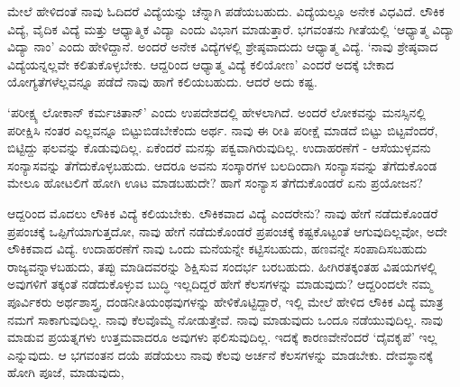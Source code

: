 ಮೇಲೆ ಹೇಳಿದಂತೆ ನಾವು ಓದಿದರೆ 
ವಿದ್ಯೆಯನ್ನು ಚೆನ್ನಾಗಿ 
ಪಡೆಯಬಹುದು. ವಿದ್ಯೆಯಲ್ಲೂ 
ಅನೇಕ ವಿಧವಿದೆ. ಲೌಕಿಕ ವಿದ್ಯೆ, 
ವೈದಿಕ ವಿದ್ಯೆ ಮತ್ತು 
ಆಧ್ಯಾತ್ಮಿಕ ವಿದ್ಯಾ  ಎಂದು 
ವಿಭಾಗ ಮಾಡುತ್ತಾರೆ. ಭಗವಂತನು 
ಗೀತೆಯಲ್ಲಿ `ಆಧ್ಯಾತ್ಮ 
ವಿದ್ಯಾ ವಿದ್ಯಾ ನಾಂ' ಎಂದು 
ಹೇಳಿದ್ದಾನೆ. ಅಂದರೆ ಅನೇಕ 
ವಿದ್ಯೆಗಳಲ್ಲಿ 
ಶ್ರೇಷ್ಠವಾದುದು ಆಧ್ಯಾತ್ಮ 
ವಿದ್ಯೆ. `ನಾವು ಶ್ರೇಷ್ಠವಾದ 
ವಿದ್ಯೆಯನ್ನಲ್ಲವೇ 
ಕಲಿತುಕೊಳ್ಳಬೇಕು. ಆದ್ದರಿಂದ 
ಆಧ್ಯಾತ್ಮ ವಿದ್ಯೆ ಕಲಿಯೋಣ' 
ಎಂದರೆ ಅದಕ್ಕೆ ಬೇಕಾದ 
ಯೋಗ್ಯತೆಗಳೆಲ್ಲವನ್ನೂ ಪಡೆದೆ ನಾವು ಹಾಗೆ ಕಲಿಯಬಹುದು. ಆದರೆ ಅದು ಕಷ್ಟ.

`ಪರೀಕ್ಷ್ಯ ಲೋಕಾನ್ 
ಕರ್ಮಚಿತಾನ್' ಎಂದು 
ಉಪದೇಶದಲ್ಲಿ ಹೇಳಲಾಗಿದೆ. 
ಅಂದರೆ ಲೋಕವನ್ನು 
ಮನಸ್ಸಿನಲ್ಲಿ ಪರೀಕ್ಷಿಸಿ 
ನಂತರ ಎಲ್ಲವನ್ನೂ 
ಬಿಟ್ಟುಬಿಡಬೇಕೆಂದು ಅರ್ಥ. 
ನಾವು ಈ ರೀತಿ ಪರೀಕ್ಷೆ ಮಾಡದೆ 
ಬಿಟ್ಟು ಬಿಟ್ಟವೆಂದರೆ, 
ಬಿಟ್ಟಿದ್ದು ಫಲವನ್ನು 
ಕೊಡುವುದಿಲ್ಲ. ಏಕೆಂದರೆ 
ಮನಸ್ಸು ಪಕ್ವವಾಗಿರುವುದಿಲ್ಲ. 
ಉದಾಹರಣೆಗೆ - ಆಸೆಯುಳ್ಳವನು 
ಸಂನ್ಯಾಸವನ್ನು 
ತೆಗೆದುಕೊಳ್ಳಬಹುದು. ಆದರೂ 
ಅವನು ಸಂಸ್ಕಾರಗಳ ಬಲದಿಂದಾಗಿ 
ಸಂನ್ಯಾಸವನ್ನು ತೆಗೆದುಕೊಂಡ 
ಮೇಲೂ ಹೋಟಲಿಗೆ ಹೋಗಿ ಊಟ ಮಾಡಬಹುದೇ? ಹಾಗೆ ಸಂನ್ಯಾಸ ತೆಗೆದುಕೊಂಡರೆ ಏನು ಪ್ರಯೋಜನ?

ಆದ್ದರಿಂದ ಮೊದಲು ಲೌಕಿಕ 
ವಿದ್ಯೆ ಕಲಿಯಬೇಕು. ಲೌಕಿಕವಾದ 
ವಿದ್ಯೆ ಎಂದರೇನು? ನಾವು ಹೇಗೆ 
ನಡೆದುಕೊಂಡರೆ ಪ್ರಪಂಚಕ್ಕೆ 
ಒಪ್ಪಿಗೆಯಾಗುತ್ತದೋ, ನಾವು 
ಹೇಗೆ ನಡೆದುಕೊಂಡರೆ 
ಪ್ರಪಂಚಕ್ಕೆ ಕಷ್ಟಕೊಟ್ಟಂತೆ 
ಆಗುವುದಿಲ್ಲವೋ, ಅದೇ 
ಲೌಕಿಕವಾದ ವಿದ್ಯೆ. 
ಉದಾಹರಣೆಗೆ ನಾವು ಒಂದು 
ಮನೆಯನ್ನೇ ಕಟ್ಟಿಸಬಹುದು, 
ಹಣವನ್ನೇ ಸಂಪಾದಿಸಬಹುದು 
ರಾಜ್ಯವನ್ನಾಳಬಹುದು, ತಪ್ಪು 
ಮಾಡಿದವರನ್ನು ಶಿಕ್ಷಿಸುವ 
ಸಂದರ್ಭ ಬರಬಹುದು. 
ಹೀಗಿರತಕ್ಕಂತಹ ವಿಷಯಗಳಲ್ಲಿ 
ಅವುಗಳಿಗೆ ತಕ್ಕಂತೆ 
ನಡೆದುಕೊಳ್ಳುವ ಬುದ್ಧಿ 
ಇಲ್ಲದಿದ್ದರೆ ಹೇಗೆ 
ಕೆಲಸಗಳನ್ನು ಮಾಡುವುದು? 
ಆದ್ದರಿಂದಲೇ ನಮ್ಮ ಪೂರ್ವಿಕರು 
ಅರ್ಥಶಾಸ್ತ್ರ, 
ದಂಡನೀತಿಯಂಥವುಗಳನ್ನು 
ಹೇಳಿಕೊಟ್ಟಿದ್ದಾರೆ, ಇಲ್ಲಿ 
ಮೇಲೆ ಹೇಳಿದ ಲೌಕಿಕ ವಿದ್ಯೆ 
ಮಾತ್ರ ನಮಗೆ ಸಾಕಾಗುವುದಿಲ್ಲ. 
ನಾವು ಕೆಲವೊಮ್ಮೆ 
ನೋಡುತ್ತೇವೆ. ನಾವು ಮಾಡುವುದು 
ಒಂದೂ ನಡೆಯುವುದಿಲ್ಲ. ನಾವು 
ಮಾಡುವ ಪ್ರಯತ್ನಗಳು 
ಉತ್ತಮವಾದರೂ ಅವುಗಳು 
ಫಲಿಸುವುದಿಲ್ಲ. ಇದಕ್ಕೆ 
ಕಾರಣವೇನೆಂದರೆ `ದೈವಕೃಪೆ' 
ಇಲ್ಲ ಎನ್ನುವುದು. ಆ ಭಗವಂತನ 
ದಯೆ ಪಡೆಯಲು ನಾವು ಕೆಲವು 
ಅರ್ಚನೆ ಕೆಲಸಗಳನ್ನು ಮಾಡಬೇಕು. ದೇವಸ್ಥಾನಕ್ಕೆ ಹೋಗಿ ಪೂಜೆ, ಮಾಡುವುದು,  


